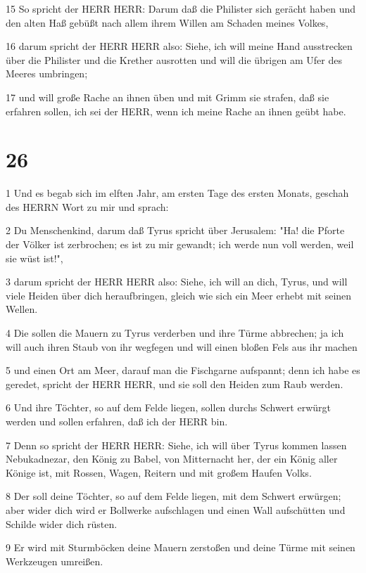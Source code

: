 \par 15 So spricht der HERR HERR: Darum daß die Philister sich gerächt haben und den alten Haß gebüßt nach allem ihrem Willen am Schaden meines Volkes,
\par 16 darum spricht der HERR HERR also: Siehe, ich will meine Hand ausstrecken über die Philister und die Krether ausrotten und will die übrigen am Ufer des Meeres umbringen;
\par 17 und will große Rache an ihnen üben und mit Grimm sie strafen, daß sie erfahren sollen, ich sei der HERR, wenn ich meine Rache an ihnen geübt habe.

\chapter{26}

\par 1 Und es begab sich im elften Jahr, am ersten Tage des ersten Monats, geschah des HERRN Wort zu mir und sprach:
\par 2 Du Menschenkind, darum daß Tyrus spricht über Jerusalem: "Ha! die Pforte der Völker ist zerbrochen; es ist zu mir gewandt; ich werde nun voll werden, weil sie wüst ist!",
\par 3 darum spricht der HERR HERR also: Siehe, ich will an dich, Tyrus, und will viele Heiden über dich heraufbringen, gleich wie sich ein Meer erhebt mit seinen Wellen.
\par 4 Die sollen die Mauern zu Tyrus verderben und ihre Türme abbrechen; ja ich will auch ihren Staub von ihr wegfegen und will einen bloßen Fels aus ihr machen
\par 5 und einen Ort am Meer, darauf man die Fischgarne aufspannt; denn ich habe es geredet, spricht der HERR HERR, und sie soll den Heiden zum Raub werden.
\par 6 Und ihre Töchter, so auf dem Felde liegen, sollen durchs Schwert erwürgt werden und sollen erfahren, daß ich der HERR bin.
\par 7 Denn so spricht der HERR HERR: Siehe, ich will über Tyrus kommen lassen Nebukadnezar, den König zu Babel, von Mitternacht her, der ein König aller Könige ist, mit Rossen, Wagen, Reitern und mit großem Haufen Volks.
\par 8 Der soll deine Töchter, so auf dem Felde liegen, mit dem Schwert erwürgen; aber wider dich wird er Bollwerke aufschlagen und einen Wall aufschütten und Schilde wider dich rüsten.
\par 9 Er wird mit Sturmböcken deine Mauern zerstoßen und deine Türme mit seinen Werkzeugen umreißen.
